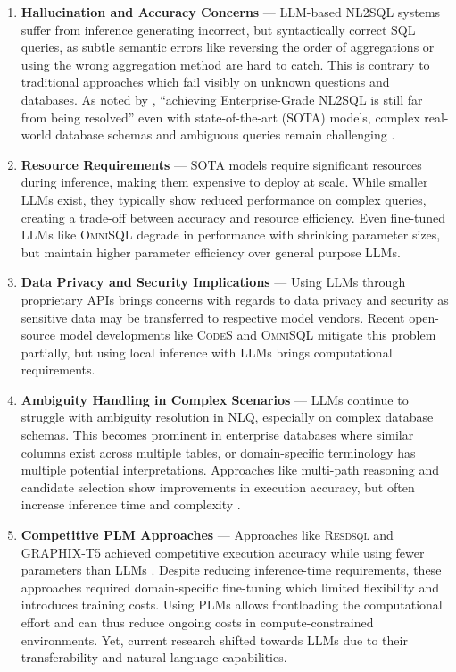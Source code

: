 \begin{enumerate}
    \item \textbf{Hallucination and Accuracy Concerns} — LLM-based NL2SQL
        systems suffer from inference generating incorrect, but syntactically
        correct SQL queries, as subtle semantic errors like reversing the order
        of aggregations or using the wrong aggregation method are hard to
        catch. This is contrary to traditional approaches which fail visibly on
        unknown questions and databases. As noted by
        \citeauthor{NL2SQLUnsolved}, ``achieving Enterprise-Grade NL2SQL is
        still far from being resolved'' even with state-of-the-art (SOTA)
        models, complex real-world database schemas and ambiguous queries
        remain challenging \citep{NL2SQLUnsolved, Spider2}.
    \item \textbf{Resource Requirements} — SOTA models require
        significant resources during inference, making them
        expensive to deploy at scale. While smaller LLMs exist, they
        typically show reduced performance on complex queries, creating a
        trade-off between accuracy and resource efficiency. Even fine-tuned
        LLMs like \textsc{OmniSQL} degrade in performance with shrinking
        parameter sizes, but maintain higher parameter efficiency over
        general purpose LLMs.
    \item \textbf{Data Privacy and Security Implications} — Using LLMs through
        proprietary APIs brings concerns with regards to data privacy and
        security as sensitive data may be transferred to respective model
        vendors. Recent open-source model developments like \textsc{CodeS} and
        \textsc{OmniSQL} mitigate this problem partially, but using local
        inference with LLMs brings computational requirements.
    \item \textbf{Ambiguity Handling in Complex Scenarios} — LLMs continue to
        struggle with ambiguity resolution in NLQ, especially on complex
        database schemas. This becomes prominent in enterprise databases
        where similar columns exist across multiple tables, or domain-specific
        terminology has multiple potential interpretations. Approaches
        like multi-path reasoning and candidate selection show improvements in
        execution accuracy, but often increase inference time and complexity
        \citep{CHASE, XiYan}.
    \item \textbf{Competitive PLM Approaches} — Approaches like
        \textsc{Resdsql} and GRAPHIX-T5 achieved competitive execution accuracy
        while using fewer parameters than LLMs \citep{RESDSQL}. Despite
        reducing inference-time requirements, these approaches required
        domain-specific fine-tuning which limited flexibility and introduces
        training costs. Using PLMs allows frontloading the computational effort
        and can thus reduce ongoing costs in compute-constrained environments.
        Yet, current research shifted towards LLMs due to their transferability
        and natural language capabilities.
\end{enumerate}
